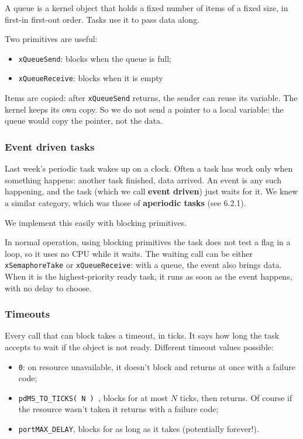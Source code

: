 \documentclass[a4paper,11pt]{article}
\begin{document}
A queue is a kernel object that holds a fixed number of items of a fixed size, in first-in first-out order. Tasks use it to pass data along.

Two primitives are useful:
\begin{itemize}
	\item \texttt{xQueueSend}: blocks when the queue is full;
	\item \texttt{xQueueReceive}: blocks when it is empty
\end{itemize}
Items are copied: after \texttt{xQueueSend} returns, the sender can reuse its variable. The kernel keeps its own copy.
So we do not send a pointer to a local variable: the queue would copy the pointer, not the data.

\subsubsection{Event driven tasks}

Last week's periodic task wakes up on a clock. Often a task has work only when something happens: another task finished, data arrived. An event is any such happening, and the task (which we call \textbf{event driven}) just waits for it.
We knew a similar category, which was those of \textbf{aperiodic tasks} (see 6.2.1).

We implement this easily with blocking primitives.

In normal operation, using blocking primitives the task does not test a flag in a loop, so it uses no CPU while it waits.
The waiting call can be either \texttt{xSemaphoreTake} or \texttt{xQueueReceive}: with a queue, the event also brings data.
When it is the highest-priority ready task, it runs as soon as the event happens, with no delay to choose.

\subsubsection{Timeouts}

Every call that can block takes a timeout, in ticks. It says how long the task accepts to wait if the object is not ready.
Different timeout values possible:
\begin{itemize}
	\item \texttt{0}: on resource unavailable, it doesn't block and returns at once with a failure code;
	\item \texttt{pdMS\_TO\_TICKS( N ) }, blocks for at most $N$ ticks, then returns. Of course if the resource wasn't taken it returns with a failure code;
	\item \texttt{portMAX\_DELAY}, blocks for as long as it takes (potentially forever!).
\end{itemize}
\end{document}
